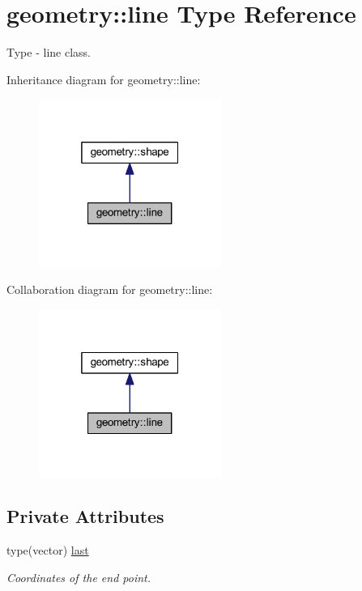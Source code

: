 \hypertarget{structgeometry_1_1line}{}\section{geometry\+:\+:line Type Reference}
\label{structgeometry_1_1line}


Type -\/ line class.  




Inheritance diagram for geometry\+:\+:line\+:\nopagebreak
\begin{figure}[H]
\begin{center}
\leavevmode
\includegraphics[width=169pt]{structgeometry_1_1line__inherit__graph}
\end{center}
\end{figure}


Collaboration diagram for geometry\+:\+:line\+:\nopagebreak
\begin{figure}[H]
\begin{center}
\leavevmode
\includegraphics[width=169pt]{structgeometry_1_1line__coll__graph}
\end{center}
\end{figure}
\subsection*{Private Attributes}
\begin{DoxyCompactItemize}
\item 
type(vector) \mbox{\hyperlink{structgeometry_1_1line_ab899fb3b6da58896cd14e2f1a474c457}{last}}
\begin{DoxyCompactList}\small\item\em Coordinates of the end point. \end{DoxyCompactList}\end{DoxyCompactItemize}


